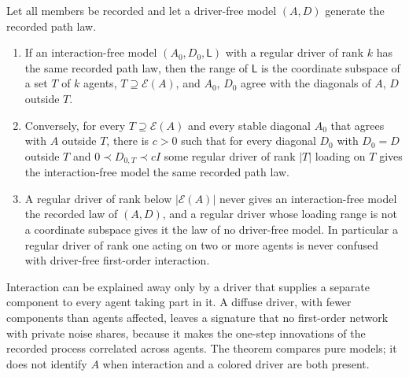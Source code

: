 \begin{theorem}\label{thm:idn-path}
Let all members be recorded and let a driver-free model $(A,D)$ generate the recorded path law.
\begin{enumerate}
\item[(a)] If an interaction-free model $(A_0,D_0,\mathsf L)$ with a regular driver of rank $k$ has the same recorded path law, then the range of $\mathsf L$ is the coordinate subspace of a set $T$ of $k$ agents, $T\supseteq\mathcal E(A)$, and $A_0$, $D_0$ agree with the diagonals of $A$, $D$ outside $T$.
\item[(b)] Conversely, for every $T\supseteq\mathcal E(A)$ and every stable diagonal $A_0$ that agrees with $A$ outside $T$, there is $c>0$ such that for every diagonal $D_0$ with $D_0=D$ outside $T$ and $0\prec D_{0,T}\prec cI$ some regular driver of rank $|T|$ loading on $T$ gives the interaction-free model the same recorded path law.
\item[(c)] A regular driver of rank below $|\mathcal E(A)|$ never gives an interaction-free model the recorded law of $(A,D)$, and a regular driver whose loading range is not a coordinate subspace gives it the law of no driver-free model. In particular a regular driver of rank one acting on two or more agents is never confused with driver-free first-order interaction.
\end{enumerate}
\end{theorem}

Interaction can be explained away only by a driver that supplies a separate component to every agent taking part in it. A diffuse driver, with fewer components than agents affected, leaves a signature that no first-order network with private noise shares, because it makes the one-step innovations of the recorded process correlated across agents. The theorem compares pure models; it does not identify $A$ when interaction and a colored driver are both present.

